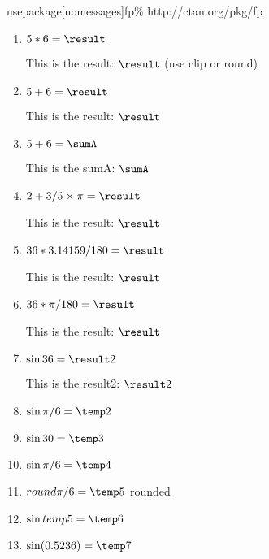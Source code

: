 

\usepackage[nomessages]{fp}%



usepackage[nomessages]{fp}\% http://ctan.org/pkg/fp

\begin{enumerate}
\item {}
$5*6=\result$
\par This is the result: $\result$ (use clip or round)

\item {}
$5+6=\result$
\par This is the result: $\result$

\item {} \par
$5+6=\sumA$
\par This is the sumA: $\sumA$

\item {}
$2+3/5\times\pi=\result$
\par This is the result: $\result$

\item {}
$36*3.14159/180=\result$
\par This is the result: $\result$

\item {}
$36*\pi/180=\result$
 \par This is the result: $\result$

\item {}%
$\sin 36 = \result2$
\par This is the result2: $\result2$

\item {} 
$\sin \pi/6 = \temp2$

\item {} 
$\sin 30 = \temp3$

\item {} 
$\sin \pi/6 = \temp4$

\item {} 
$round \pi/6 = \temp5$  rounded

\item {} 
$\sin temp5 = \temp6$


\item {} 
$\sin (0.5236) = \temp7$


\end{enumerate}
